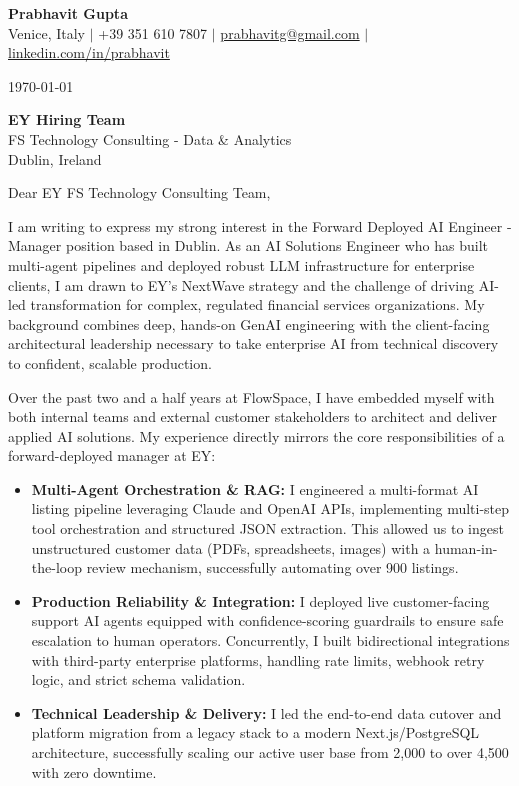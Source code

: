 \documentclass[a4paper,11pt]{article}
\begin{document}
\begin{center}
  {\Huge\bfseries Prabhavit Gupta}\\[5pt]
  Venice, Italy $\vert$ +39 351 610 7807 $\vert$ \href{mailto:prabhavitg@gmail.com}{prabhavitg@gmail.com} $\vert$ \href{https://www.linkedin.com/in/prabhavit/}{linkedin.com/in/prabhavit}
\end{center}

\vspace{2em}

\today

\textbf{EY Hiring Team}\\
FS Technology Consulting - Data \& Analytics\\
Dublin, Ireland

\vspace{1.5em}

Dear EY FS Technology Consulting Team,

I am writing to express my strong interest in the Forward Deployed AI Engineer - Manager position based in Dublin. As an AI Solutions Engineer who has built multi-agent pipelines and deployed robust LLM infrastructure for enterprise clients, I am drawn to EY's NextWave strategy and the challenge of driving AI-led transformation for complex, regulated financial services organizations. My background combines deep, hands-on GenAI engineering with the client-facing architectural leadership necessary to take enterprise AI from technical discovery to confident, scalable production.

Over the past two and a half years at FlowSpace, I have embedded myself with both internal teams and external customer stakeholders to architect and deliver applied AI solutions. My experience directly mirrors the core responsibilities of a forward-deployed manager at EY:

\begin{itemize}
    \item \textbf{Multi-Agent Orchestration \& RAG:} I engineered a multi-format AI listing pipeline leveraging Claude and OpenAI APIs, implementing multi-step tool orchestration and structured JSON extraction. This allowed us to ingest unstructured customer data (PDFs, spreadsheets, images) with a human-in-the-loop review mechanism, successfully automating over 900 listings.
    \item \textbf{Production Reliability \& Integration:} I deployed live customer-facing support AI agents equipped with confidence-scoring guardrails to ensure safe escalation to human operators. Concurrently, I built bidirectional integrations with third-party enterprise platforms, handling rate limits, webhook retry logic, and strict schema validation.
    \item \textbf{Technical Leadership \& Delivery:} I led the end-to-end data cutover and platform migration from a legacy stack to a modern Next.js/PostgreSQL architecture, successfully scaling our active user base from 2,000 to over 4,500 with zero downtime.
\end{itemize}
\end{document}
